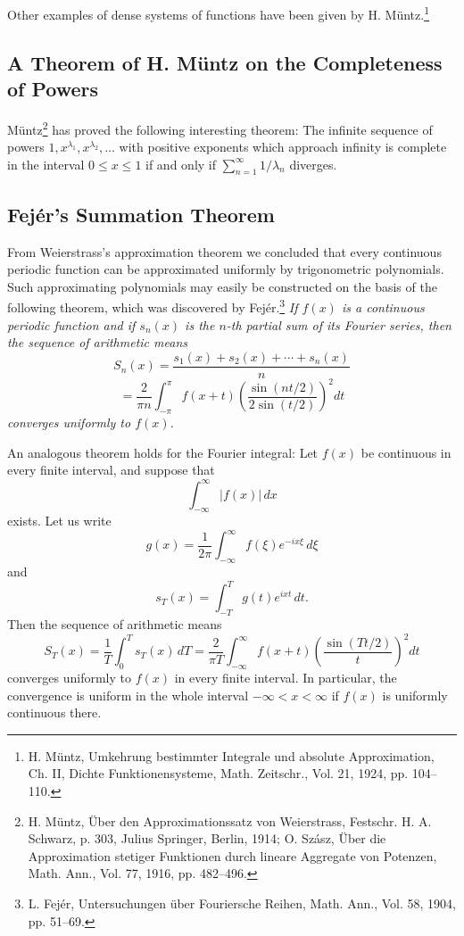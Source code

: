 Other examples of dense systems of functions have been given by H. M\"untz.\footnote{H. M\"untz, Umkehrung bestimmter Integrale und absolute Approximation, Ch. II, Dichte Funktionensysteme, Math. Zeitschr., Vol. 21, 1924, pp. 104--110.}

\subsection{A Theorem of H. M\"untz on the Completeness of Powers}
M\"untz\footnote{H. M\"untz, \"Uber den Approximationssatz von Weierstrass, Festschr. H. A. Schwarz, p. 303, Julius Springer, Berlin, 1914; O. Sz\'asz, \"Uber die Approximation stetiger Funktionen durch lineare Aggregate von Potenzen, Math. Ann., Vol. 77, 1916, pp. 482--496.} has proved the following interesting theorem: The infinite sequence of powers $1,x^{\lambda_1},x^{\lambda_2},\ldots$ with positive exponents which approach infinity is complete in the interval $0\le x\le1$ if and only if $\sum_{n=1}^{\infty}1/\lambda_n$ diverges.

\subsection{Fej\'er's Summation Theorem}
From Weierstrass's approximation theorem we concluded that every continuous periodic function can be approximated uniformly by trigonometric polynomials. Such approximating polynomials may easily be constructed on the basis of the following theorem, which was discovered by Fej\'er.\footnote{L. Fej\'er, Untersuchungen \"uber Fouriersche Reihen, Math. Ann., Vol. 58, 1904, pp. 51--69.} \emph{If $f(x)$ is a continuous periodic function and if $s_n(x)$ is the $n$-th partial sum of its Fourier series, then the sequence of arithmetic means}
\[
S_n(x)=\frac{s_1(x)+s_2(x)+\cdots+s_n(x)}{n}
\]
\[
=\frac{2}{\pi n}\int_{-\pi}^{\pi}f(x+t)
\left(\frac{\sin(nt/2)}{2\sin(t/2)}\right)^2dt
\]
\emph{converges uniformly to $f(x)$.}

An analogous theorem holds for the Fourier integral: Let $f(x)$ be continuous in every finite interval, and suppose that
\[
\int_{-\infty}^{\infty}|f(x)|\,dx
\]
exists. Let us write
\[
g(x)=\frac{1}{2\pi}\int_{-\infty}^{\infty}f(\xi)e^{-ix\xi}\,d\xi
\]
and
\[
s_T(x)=\int_{-T}^{T}g(t)e^{ixt}\,dt.
\]
Then the sequence of arithmetic means
\[
S_T(x)=\frac{1}{T}\int_0^T s_T(x)\,dT
=\frac{2}{\pi T}\int_{-\infty}^{\infty}f(x+t)
\left(\frac{\sin(Tt/2)}{t}\right)^2dt
\]
converges uniformly to $f(x)$ in every finite interval. In particular, the convergence is uniform in the whole interval $-\infty<x<\infty$ if $f(x)$ is uniformly continuous there.

